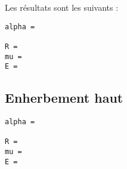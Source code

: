 \documentclass[a4paper, 11pt]{article}
\begin{document}
Les résultats sont les suivants :
\begin{verbatim}
alpha =

R =
mu =
E =
\end{verbatim}

\begin{figure}[ht]
 \centering
 \caption{}
\end{figure}

\newpage
\subsection{Enherbement haut}
\begin{verbatim}
alpha =

R =
mu =
E =
\end{verbatim}

\begin{figure}[ht]
 \centering
 \caption{}
\end{figure}
\end{document}
